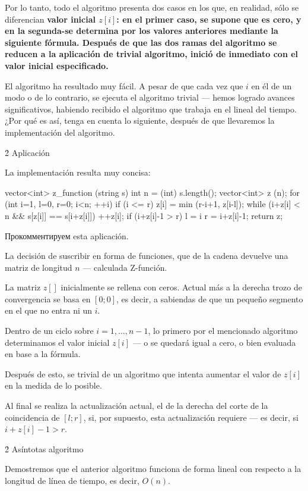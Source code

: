 Por lo tanto, todo el algoritmo presenta dos casos en los que, en realidad, sólo se diferencian \bf{valor inicial} $z[i]$: en el primer caso, se supone que es cero, y en la segunda-se determina por los valores anteriores mediante la siguiente fórmula. Después de que las dos ramas del algoritmo se reducen a la aplicación de \bf{trivial algoritmo}, inició de inmediato con el valor inicial especificado.

El algoritmo ha resultado muy fácil. A pesar de que cada vez que $i$ en él de un modo o de lo contrario, se ejecuta el algoritmo trivial --- hemos logrado avances significativos, habiendo recibido el algoritmo que trabaja en el lineal del tiempo. ¿Por qué es así, tenga en cuenta lo siguiente, después de que llevaremos la implementación del algoritmo.


\h2{ Aplicación }

La implementación resulta muy concisa:

\code
vector<int> z_function (string s) {
int n = (int) s.length();
vector<int> z (n);
for (int i=1, l=0, r=0; i<n; ++i) {
if (i <= r)
z[i] = min (r-i+1, z[i-l]);
while (i+z[i] < n && s[z[i]] == s[i+z[i]])
++z[i];
if (i+z[i]-1 > r)
l = i r = i+z[i]-1;
}
return z;
}
\endcode

Прокомментируем esta aplicación.

La decisión de suscribir en forma de funciones, que de la cadena devuelve una matriz de longitud $n$ --- calculada Z-función.

La matriz $z[]$ inicialmente se rellena con ceros. Actual más a la derecha trozo de convergencia se basa en $[0;0]$, es decir, a sabiendas de que un pequeño segmento en el que no entra ni un $i$.

Dentro de un ciclo sobre $i = 1, \ldots, n-1$, lo primero por el mencionado algoritmo determinamos el valor inicial $z[i]$ --- o se quedará igual a cero, o bien evaluada en base a la fórmula.

Después de esto, se trivial de un algoritmo que intenta aumentar el valor de $z[i]$ en la medida de lo posible.

Al final se realiza la actualización actual, el de la derecha del corte de la coincidencia de $[l;r]$, si, por supuesto, esta actualización requiere --- es decir, si $i+z[i]-1 > r$.


\h2{ Asíntotas algoritmo }

Demostremos que el anterior algoritmo funciona de forma lineal con respecto a la longitud de línea de tiempo, es decir, $O (n)$.


